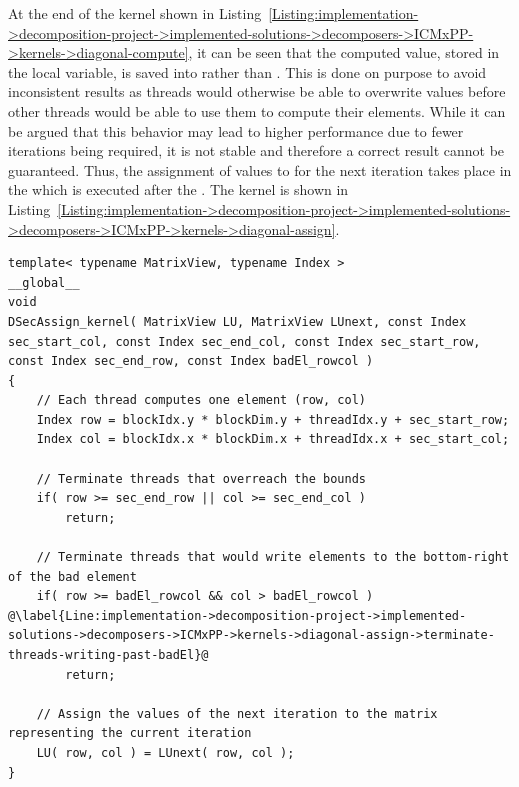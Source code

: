 At the end of the kernel shown in Listing~\ref{Listing:implementation->decomposition-project->implemented-solutions->decomposers->ICMxPP->kernels->diagonal-compute}, it can be seen that the computed value, stored in the  local variable, is saved into  rather than .
This is done on purpose to avoid inconsistent results as threads would otherwise be able to overwrite values before other threads would be able to use them to compute their elements.
While it can be argued that this behavior may lead to higher performance due to fewer iterations being required, it is not stable and therefore a correct result cannot be guaranteed.
Thus, the assignment of values to  for the next iteration takes place in the  which is executed after the .
The  kernel is shown in Listing~\ref{Listing:implementation->decomposition-project->implemented-solutions->decomposers->ICMxPP->kernels->diagonal-assign}.

\begin{lstlisting}[caption={The implementation of the \code{DSecAssign\_kernel()} kernel that assigns values of the next iteration to the matrix representing the current iteration.
Note that the matrices are passed using their views and the indices are copied to the local memory of each thread.},label={Listing:implementation->decomposition-project->implemented-solutions->decomposers->ICMxPP->kernels->diagonal-assign},escapechar=@]
template< typename MatrixView, typename Index >
__global__
void
DSecAssign_kernel( MatrixView LU, MatrixView LUnext, const Index sec_start_col, const Index sec_end_col, const Index sec_start_row, const Index sec_end_row, const Index badEl_rowcol )
{
	// Each thread computes one element (row, col)
	Index row = blockIdx.y * blockDim.y + threadIdx.y + sec_start_row;
	Index col = blockIdx.x * blockDim.x + threadIdx.x + sec_start_col;
	
	// Terminate threads that overreach the bounds
	if( row >= sec_end_row || col >= sec_end_col )
		return;
	
	// Terminate threads that would write elements to the bottom-right of the bad element
	if( row >= badEl_rowcol && col > badEl_rowcol ) @\label{Line:implementation->decomposition-project->implemented-solutions->decomposers->ICMxPP->kernels->diagonal-assign->terminate-threads-writing-past-badEl}@
		return;
	
	// Assign the values of the next iteration to the matrix representing the current iteration
	LU( row, col ) = LUnext( row, col );
}
\end{lstlisting}

